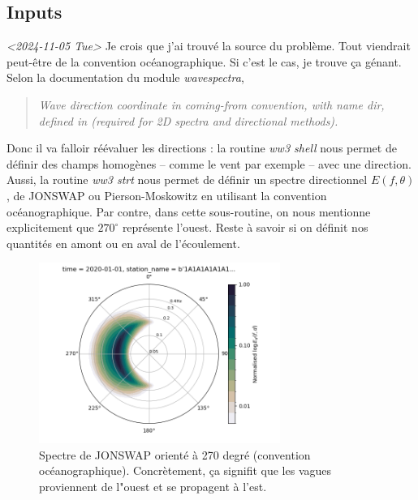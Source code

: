 \documentclass[10pt]{article}
\numberwithin{equation}{section}
\begin{document}
\subsection{Inputs}
\label{sec:orgc19de2a}

\textit{<2024-11-05 Tue> } Je crois que j'ai trouvé la source du problème. Tout viendrait peut-être de la convention océanographique. Si c'est le cas, je trouve ça génant. Selon la documentation du module \emph{wavespectra},

\begin{quote}
\emph{Wave direction coordinate in coming-from convention, with name dir, defined in (required for 2D spectra and directional methods).}
\end{quote}

Donc il va falloir réévaluer les directions : la routine \emph{ww3 shell} nous permet de définir des champs homogènes -- comme le vent par exemple -- avec une direction. Aussi, la routine \emph{ww3 strt} nous permet de définir un spectre directionnel \(E(f,\theta)\), de JONSWAP ou Pierson-Moskowitz en utilisant la convention océanographique. Par contre, dans cette sous-routine, on nous mentionne explicitement que \(270^\circ\) représente l'ouest. Reste à savoir si on définit nos quantités en amont ou en aval de l'écoulement.\bigskip

\begin{figure}[!h]
\begin{center}
\includegraphics[width=0.7\textwidth]{Figures/figures/jonswap-wavespectra3.png}
\begin{minipage}{0.7\textwidth}
\caption{Spectre de JONSWAP orienté à 270 degré (convention océanographique). Concrètement, ça signifit que les vagues proviennent de l"ouest et se propagent à l'est.}
\label{fig:jonswap}
\end{minipage}
\end{center}
\end{figure}
\end{document}
